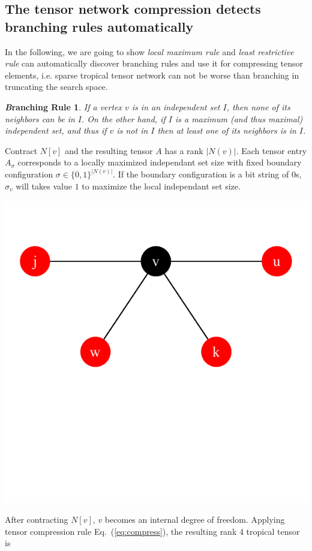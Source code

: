 \documentclass{article}
\newcommand{\<}{\langle}
\renewcommand{\>}{\rangle}
\newcommand{\Eq}[1]{Eq.~(\ref{#1})}
\newtheorem{corollary}{\textit Branching Rule}
\theoremstyle{definition}\newtheorem{definition}{\textit{Definition}}
\begin{document}
\subsection{The tensor network compression detects branching rules automatically}
In the following, we are going to show \textit{local maximum rule} and \textit{least restrictive rule} can automatically discover branching rules and use it for compressing tensor elements,
i.e. sparse tropical tensor network can not be worse than branching in truncating the search space.

\begin{corollary}\label{rule:one} %
  If a vertex $v$ is in an independent set $I$, then none of its neighbors can be in $I$.
On the other hand, if $I$ is a maximum (and thus maximal) independent set,
and thus if $v$ is not in $I$ then at least one of its neighbors is in $I$.
\end{corollary}

Contract $N[v]$ and the resulting tensor $A$ has a rank $|N(v)|$. Each tensor entry $A_{\sigma}$ corresponds to a locally maximized independant set size with fixed boundary configuration $\sigma \in \{0, 1\}^{|N(v)|}$.
If the boundary configuration is a bit string of 0s, $\sigma_v$ will takes value $1$ to maximize the local independant set size.

\centerline{\includegraphics[width=0.4\columnwidth,trim={0 3.5cm 0 1cm},clip]{../notebooks/basic.pdf}}

After contracting $N[v]$, $v$ becomes an internal degree of freedom.
Applying tensor compression rule \Eq{eq:compress}, the resulting rank 4 tropical tensor is
\end{document}
